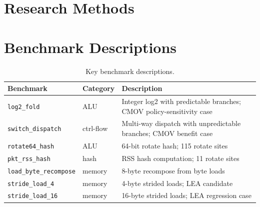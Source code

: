 


\appendix

\section{Research Methods}

\section{Benchmark Descriptions}
\label{appendix:benchmarks}

\begin{table}[h]
  \centering
  \caption{Key benchmark descriptions.}
  \label{tab:bench_desc}
  \small
  \begin{tabular}{llp{4.2cm}}
    \toprule
    Benchmark & Category & Description \\
    \midrule
    \texttt{log2\_fold}            & ALU       & Integer log2 with predictable branches; CMOV policy-sensitivity case \\
    \texttt{switch\_dispatch}      & ctrl-flow & Multi-way dispatch with unpredictable branches; CMOV benefit case \\
    \texttt{rotate64\_hash}        & ALU       & 64-bit rotate hash; 115 rotate sites \\
    \texttt{pkt\_rss\_hash}        & hash      & RSS hash computation; 11 rotate sites \\
    \texttt{load\_byte\_recompose} & memory    & 8-byte recompose from byte loads \\
    \texttt{stride\_load\_4}       & memory    & 4-byte strided loads; LEA candidate \\
    \texttt{stride\_load\_16}      & memory    & 16-byte strided loads; LEA regression case \\
    \bottomrule
  \end{tabular}
\end{table}